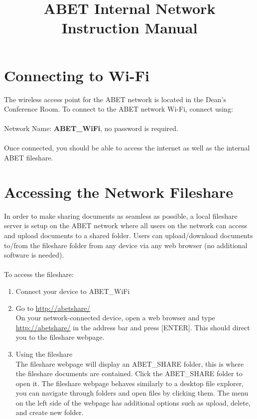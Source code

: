 \documentclass{article}
\date{}
\title{ABET Internal Network Instruction Manual}
\begin{document}
\maketitle


\section{Connecting to Wi-Fi}

The wireless access point for the ABET network is located in the Dean's
Conference Room. To connect to the ABET network Wi-Fi, connect using:
\\\\
\indent Network Name: \textbf{ABET\_WiFi}, no password is required.
\\\\
Once connected, you should be able to access the internet as well as the
internal ABET fileshare.

\section{Accessing the Network Fileshare}

In order to make sharing documents as seamless as possible, a local fileshare
server is setup on the ABET network where all users on the network can access
and upload documents to a shared folder. Users can upload/download documents
to/from the fileshare folder from any device via any web browser (no additional
software is needed).
\\\\
To access the fileshare:
\begin{enumerate}
  \item{Connect your device to ABET\_WiFi}

  \item{Go to \url{http://abetshare/}}
    \\
    On your network-connected device, open a web browser and type
    \url{http://abetshare/} in the address bar and press [ENTER]. This should
    direct you to the fileshare webpage.

  \item{Using the fileshare}
    \\
    The fileshare webpage will display an ABET\_SHARE folder, this is where the
    fileshare documents are contained. Click the ABET\_SHARE folder to open it.
    The fileshare webpage behaves similarly to a desktop file explorer, you can
    navigate through folders and open files by clicking them. The menu on the
    left side of the webpage has additional options such as upload, delete, and
    create new folder.

\end{enumerate}
\end{document}
